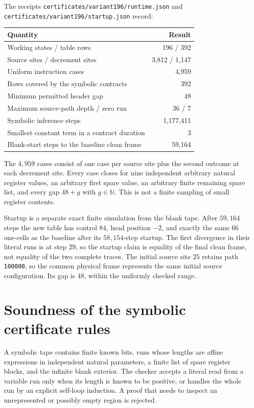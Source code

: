 \documentclass[11pt]{article}
\newcommand{\file}[1]{\texttt{\nolinkurl{#1}}}
\begin{document}
The receipts \file{certificates/variant196/runtime.json} and
\file{certificates/variant196/startup.json} record:
\begin{center}
\begin{tabular}{@{}lr@{}}
\toprule
Quantity & Result\\
\midrule
Working states / table rows & 196 / 392\\
Source sites / decrement sites & 3,812 / 1,147\\
Uniform instruction cases & 4,959\\
Rows covered by the symbolic contracts & 392\\
Minimum permitted header gap & 48\\
Maximum source-path depth / zero run & 36 / 7\\
Symbolic inference steps & 1,177,411\\
Smallest constant term in a contract duration & 3\\
Blank-start steps to the baseline clean frame & 59,164\\
\bottomrule
\end{tabular}
\end{center}
The $4{,}959$ cases consist of one case per source site plus the
second outcome at each decrement site.  Every case closes for nine
independent arbitrary natural register values, an arbitrary first
spare value, an arbitrary finite remaining spare list, and every
gap $48+g$ with $g\in\mathbb N$.  This is not a finite sampling of
small register contents.

Startup is a separate exact finite simulation from the blank tape.
After $59{,}164$ steps the new table has control $84$, head position
$-2$, and exactly the same 66 one-cells as the baseline after its
$58{,}154$-step startup.  The first divergence in their literal runs
is at step 29, so the startup claim is equality of the final clean
frame, not equality of the two complete traces.  The initial source
site $25$ retains path \texttt{100000}, so the common physical frame
represents the same initial source configuration.  Its gap is 48,
within the uniformly checked range.

\section{Soundness of the symbolic certificate rules}

A symbolic tape contains finite known bits, runs whose lengths are
affine expressions in independent natural parameters, a finite list
of spare register blocks, and the infinite blank exterior.  The
checker accepts a literal read from a variable run only when its
length is known to be positive, or handles the whole run by an
explicit self-loop induction.  A proof that needs to inspect an
unrepresented or possibly empty region is rejected.
\end{document}
